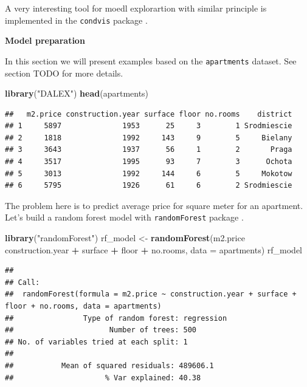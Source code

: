 \documentclass[]{krantz}
\newenvironment{Shaded}{\begin{snugshade}}{\end{snugshade}}
\newcommand{\DataTypeTok}[1]{\textcolor[rgb]{0.13,0.29,0.53}{#1}}
\newcommand{\KeywordTok}[1]{\textcolor[rgb]{0.13,0.29,0.53}{\textbf{#1}}}
\newcommand{\NormalTok}[1]{#1}
\newcommand{\OperatorTok}[1]{\textcolor[rgb]{0.81,0.36,0.00}{\textbf{#1}}}
\newcommand{\StringTok}[1]{\textcolor[rgb]{0.31,0.60,0.02}{#1}}
\theoremstyle{definition}
\theoremstyle{definition}
\theoremstyle{definition}
\theoremstyle{remark}
\begin{document}
A very interesting tool for moedl explorartion with similar principle is
implemented in the \texttt{condvis} package \citep{JSSv081i05}.

\textbf{Model preparation}

In this section we will present examples based on the
\texttt{apartments} dataset. See section TODO for more details.

\begin{Shaded}
\begin{Highlighting}[]
\KeywordTok{library}\NormalTok{(}\StringTok{"DALEX"}\NormalTok{)}
\KeywordTok{head}\NormalTok{(apartments)}
\end{Highlighting}
\end{Shaded}

\begin{verbatim}
##   m2.price construction.year surface floor no.rooms    district
## 1     5897              1953      25     3        1 Srodmiescie
## 2     1818              1992     143     9        5     Bielany
## 3     3643              1937      56     1        2       Praga
## 4     3517              1995      93     7        3      Ochota
## 5     3013              1992     144     6        5     Mokotow
## 6     5795              1926      61     6        2 Srodmiescie
\end{verbatim}

The problem here is to predict average price for square meter for an
apartment. Let's build a random forest model with \texttt{randomForest}
package \citep{R-randomForest}.

\begin{Shaded}
\begin{Highlighting}[]
\KeywordTok{library}\NormalTok{(}\StringTok{"randomForest"}\NormalTok{)}
\NormalTok{rf_model <-}\StringTok{ }\KeywordTok{randomForest}\NormalTok{(m2.price }\OperatorTok{~}\StringTok{ }\NormalTok{construction.year }\OperatorTok{+}\StringTok{ }\NormalTok{surface }\OperatorTok{+}\StringTok{ }\NormalTok{floor }\OperatorTok{+}
\StringTok{      }\NormalTok{no.rooms, }\DataTypeTok{data =}\NormalTok{ apartments)}
\NormalTok{rf_model}
\end{Highlighting}
\end{Shaded}

\begin{verbatim}
## 
## Call:
##  randomForest(formula = m2.price ~ construction.year + surface +      floor + no.rooms, data = apartments) 
##                Type of random forest: regression
##                      Number of trees: 500
## No. of variables tried at each split: 1
## 
##           Mean of squared residuals: 489606.1
##                     % Var explained: 40.38
\end{verbatim}
\end{document}
